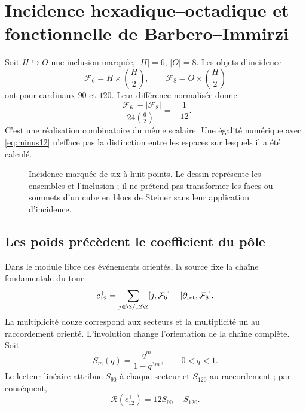 \section{Incidence hexadique--octadique et fonctionnelle de Barbero--Immirzi}
\label{sec:barbero}
Soit $H\hookrightarrow O$ une inclusion marquée, $|H|=6$, $|O|=8$.
Les objets d'incidence
\[
\mathcal F_6=H\times\binom H2,\qquad
\mathcal F_8=O\times\binom H2
\]
ont pour cardinaux $90$ et $120$. Leur différence normalisée donne
\[
\frac{|\mathcal F_6|-|\mathcal F_8|}{24\binom62}=-\frac1{12}.
\]
C'est une réalisation combinatoire du même scalaire.
Une égalité numérique avec \eqref{eq:minus12} n'efface pas
la distinction entre les espaces sur lesquels il a été calculé.

\begin{figure}[htbp]
\centering
{}
\caption{Incidence marquée de six à huit points. Le dessin représente
les ensembles et l'inclusion ; il ne prétend pas transformer les faces ou sommets
d'un cube en blocs de Steiner sans leur application d'incidence.}
\end{figure}

\subsection{Les poids précèdent le coefficient du pôle}
Dans le module libre des événements orientés, la source fixe la chaîne
fondamentale du tour \cite{precedencia}
\[
c_{12}^{+}=
\sum_{j\in\Z/12\Z}[j,\mathcal F_6]
-[\partial_{\rm ret},\mathcal F_8].
\]
La multiplicité douze correspond aux secteurs et la multiplicité un
au raccordement orienté. L'involution change l'orientation de la chaîne
complète. Soit
\[
S_m(q)=\frac{q^m}{1-q^{3m}},\qquad 0<q<1.
\]
Le lecteur linéaire attribue $S_{90}$ à chaque secteur et $S_{120}$ au raccordement ;
par conséquent,
\[
\mathscr R(c_{12}^{+})=12S_{90}-S_{120}.
\]

